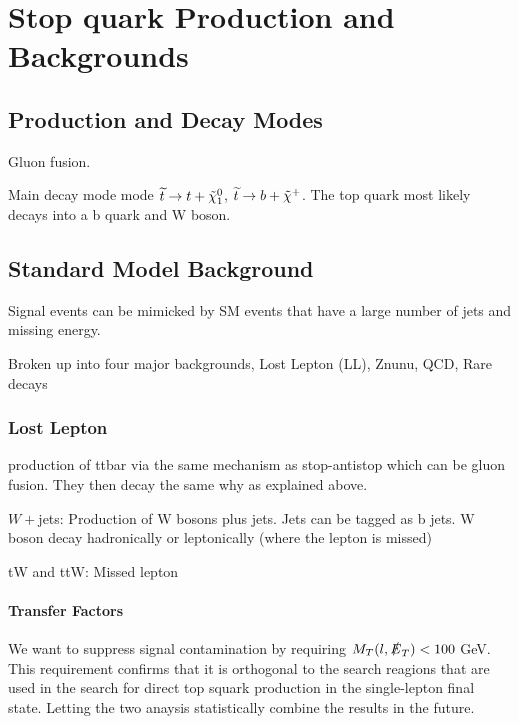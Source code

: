 \chapter{Stop quark Production and Backgrounds}
\label{ch:Search}



\section{Production and Decay Modes}
\label{sec:Production}

Gluon fusion.

Main decay mode mode $\widetilde{t}\rightarrow t+\tilde{\chi}^{0}_{1}$, $\widetilde{t}\rightarrow b+\tilde{\chi}^{+}$. The top quark most likely decays into a b quark and W boson. 

\section{Standard Model Background}
\label{sec:SMBackground}

Signal events can be mimicked by SM events that have a large number of jets and missing energy. 

Broken up into four major backgrounds, Lost Lepton (LL), Znunu, QCD, Rare decays

\subsection{Lost Lepton}
\label{subsec:LL}

\ttbar{} production of ttbar via the same mechanism as stop-antistop which can be gluon fusion. They then decay the same why as explained above.

$W+$jets: Production of W bosons plus jets. Jets can be tagged as b jets. W boson decay hadronically or leptonically (where the lepton is missed)

tW and ttW: Missed lepton

\subsubsection{Transfer Factors}
\label{subsec:TF}

We want to suppress signal contamination by requiring $M_{T}(l, \slashed{E}_{T}) < 100$ GeV. This requirement confirms that it is orthogonal to the search reagions that are used in the search for direct top squark production in the single-lepton final state. Letting the two anaysis statistically combine the results in the future. 

